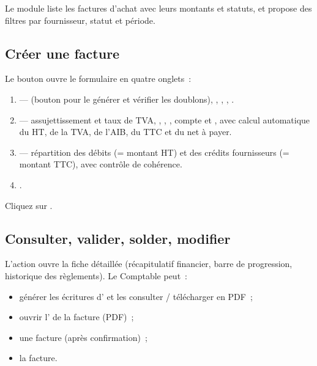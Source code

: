 Le module  liste les factures d'achat avec leurs montants et statuts, et propose des filtres par fournisseur, statut et période.

\subsection{Créer une facture}

Le bouton  ouvre le formulaire en quatre onglets~:

\begin{enumerate}
  \item {} —  (bouton  pour le générer et vérifier les doublons), , , , .
  \item {} — assujettissement et taux de TVA, , , , compte et , avec calcul automatique du HT, de la TVA, de l'AIB, du TTC et du net à payer.
  \item {} — répartition des débits (= montant HT) et des crédits fournisseurs (= montant TTC), avec contrôle de cohérence.
  \item {}.
\end{enumerate}

Cliquez sur .


\subsection{Consulter, valider, solder, modifier}

L'action  ouvre la fiche détaillée (récapitulatif financier, barre de progression, historique des règlements). Le Comptable peut~:

\begin{itemize}
  \item générer les écritures d' et les consulter / télécharger en PDF~;
  \item ouvrir l' de la facture (PDF)~;
  \item {} une facture (après confirmation)~;
  \item {} la facture.
\end{itemize}

